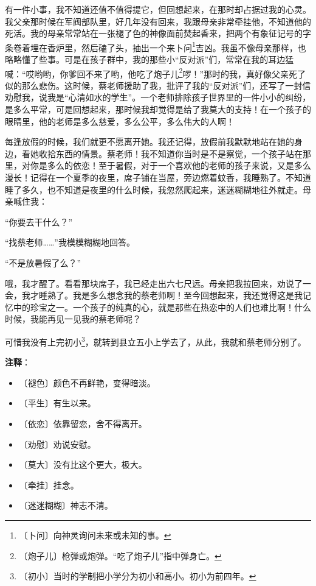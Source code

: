 \documentclass[12pt,UTF-8,openany]{ctexbook}
\begin{document}
\begin{normalsize}
    有一件小事，我不知道还值不值得提它，但回想起来，在那时却占据过我的心灵。我父亲那时候在军阀部队里，好几年没有回来，我跟母亲非常牵挂他，不知道他的死活。我的母亲常常站在一张褪了色的神像面前焚起香来，把两个有象征记号的字条卷着埋在香炉里，然后磕了头，抽出一个来卜问\footnote{〔卜问〕向神灵询问未来或未知的事。}吉凶。我虽不像母亲那样，也略略懂了些事。可是在孩子群中，我的那些小“反对派”们，常常在我的耳边猛喊：“哎哟哟，你爹回不来了哟，他吃了炮子儿\footnote{〔炮子儿〕枪弹或炮弹。“吃了炮子儿”指中弹身亡。}啰！”那时的我，真好像父亲死了似的那么悲伤。这时候，蔡老师援助了我，批评了我的“反对派”们，还写了一封信劝慰我，说我是“心清如水的学生”。一个老师排除孩子世界里的一件小小的纠纷，是多么平常，可是回想起来，那时候我却觉得是给了我莫大的支持！在一个孩子的眼睛里，他的老师是多么慈爱，多么公平，多么伟大的人啊！
    
    每逢放假的时候，我们就更不愿离开她。我还记得，放假前我默默地站在她的身边，看她收拾东西的情景。蔡老师！我不知道你当时是不是察觉，一个孩子站在那里，对你是多么的依恋！至于暑假，对于一个喜欢他的老师的孩子来说，又是多么漫长！记得在一个夏季的夜里，席子铺在当屋，旁边燃着蚊香，我睡熟了。不知道睡了多久，也不知道是夜里的什么时候，我忽然爬起来，迷迷糊糊地往外就走。母亲喊住我：
    
    “你要去干什么？”
    
    “找蔡老师……”我模模糊糊地回答。
    
    “不是放暑假了么？”
    
    哦，我才醒了。看看那块席子，我已经走出六七尺远。母亲把我拉回来，劝说了一会，我才睡熟了。我是多么想念我的蔡老师啊！至今回想起来，我还觉得这是我记忆中的珍宝之一。一个孩子的纯真的心，就是那些在热恋中的人们也难比啊！什么时候，我能再见一见我的蔡老师呢？
    
    可惜我没有上完初小\footnote{〔初小〕当时的学制把小学分为初小和高小。初小为前四年。}，就转到县立五小上学去了，从此，我就和蔡老师分别了。
    
\end{normalsize}


\newpage

\textbf{注释}：

\vspace{-1em}

\begin{itemize}
    \setlength\itemsep{-0.2em}
    \item 〔褪色〕颜色不再鲜艳，变得暗淡。
    \item 〔平生〕有生以来。
    \item 〔依恋〕依靠留恋，舍不得离开。
    \item 〔劝慰〕劝说安慰。
    \item 〔莫大〕没有比这个更大，极大。
    \item 〔牵挂〕挂念。
    \item 〔迷迷糊糊〕神志不清。
\end{itemize}
\end{document}
